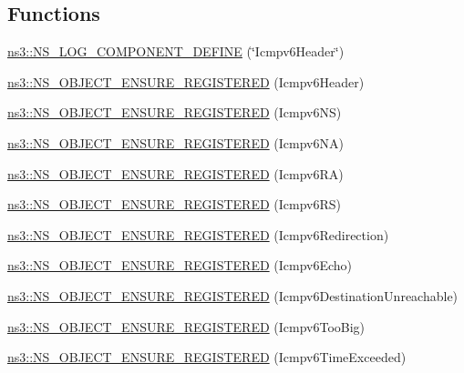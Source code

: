 \subsection*{Functions}
\begin{DoxyCompactItemize}
\item 
\hyperlink{namespacens3_ae111600e6aebec8dbdc5d34840d0b7fa}{ns3\+::\+N\+S\+\_\+\+L\+O\+G\+\_\+\+C\+O\+M\+P\+O\+N\+E\+N\+T\+\_\+\+D\+E\+F\+I\+NE} (\char`\"{}Icmpv6\+Header\char`\"{})
\item 
\hyperlink{namespacens3_a9ea123e4e086fed6c41c4d72d6f23303}{ns3\+::\+N\+S\+\_\+\+O\+B\+J\+E\+C\+T\+\_\+\+E\+N\+S\+U\+R\+E\+\_\+\+R\+E\+G\+I\+S\+T\+E\+R\+ED} (Icmpv6\+Header)
\item 
\hyperlink{namespacens3_aee34bf42a82713fba346d22b261981a1}{ns3\+::\+N\+S\+\_\+\+O\+B\+J\+E\+C\+T\+\_\+\+E\+N\+S\+U\+R\+E\+\_\+\+R\+E\+G\+I\+S\+T\+E\+R\+ED} (Icmpv6\+NS)
\item 
\hyperlink{namespacens3_a567f2825626bed912155d7aa886175b0}{ns3\+::\+N\+S\+\_\+\+O\+B\+J\+E\+C\+T\+\_\+\+E\+N\+S\+U\+R\+E\+\_\+\+R\+E\+G\+I\+S\+T\+E\+R\+ED} (Icmpv6\+NA)
\item 
\hyperlink{namespacens3_aaf7c89f01f793c3c0516d44c95df66ec}{ns3\+::\+N\+S\+\_\+\+O\+B\+J\+E\+C\+T\+\_\+\+E\+N\+S\+U\+R\+E\+\_\+\+R\+E\+G\+I\+S\+T\+E\+R\+ED} (Icmpv6\+RA)
\item 
\hyperlink{namespacens3_ad5a25d15024e8de6d42c71b781e3e631}{ns3\+::\+N\+S\+\_\+\+O\+B\+J\+E\+C\+T\+\_\+\+E\+N\+S\+U\+R\+E\+\_\+\+R\+E\+G\+I\+S\+T\+E\+R\+ED} (Icmpv6\+RS)
\item 
\hyperlink{namespacens3_a1b95da2bd5ab2bd6edf77e4fe580cc78}{ns3\+::\+N\+S\+\_\+\+O\+B\+J\+E\+C\+T\+\_\+\+E\+N\+S\+U\+R\+E\+\_\+\+R\+E\+G\+I\+S\+T\+E\+R\+ED} (Icmpv6\+Redirection)
\item 
\hyperlink{namespacens3_aed6baaf053dcf5ece7b9c7a5473bdc43}{ns3\+::\+N\+S\+\_\+\+O\+B\+J\+E\+C\+T\+\_\+\+E\+N\+S\+U\+R\+E\+\_\+\+R\+E\+G\+I\+S\+T\+E\+R\+ED} (Icmpv6\+Echo)
\item 
\hyperlink{namespacens3_a12b077a3fb27502ef94a367df802f371}{ns3\+::\+N\+S\+\_\+\+O\+B\+J\+E\+C\+T\+\_\+\+E\+N\+S\+U\+R\+E\+\_\+\+R\+E\+G\+I\+S\+T\+E\+R\+ED} (Icmpv6\+Destination\+Unreachable)
\item 
\hyperlink{namespacens3_af54388fc9a699efbee64e90fa887f806}{ns3\+::\+N\+S\+\_\+\+O\+B\+J\+E\+C\+T\+\_\+\+E\+N\+S\+U\+R\+E\+\_\+\+R\+E\+G\+I\+S\+T\+E\+R\+ED} (Icmpv6\+Too\+Big)
\item 
\hyperlink{namespacens3_a32ae88ea82aca661e8376f4f2f6e8e77}{ns3\+::\+N\+S\+\_\+\+O\+B\+J\+E\+C\+T\+\_\+\+E\+N\+S\+U\+R\+E\+\_\+\+R\+E\+G\+I\+S\+T\+E\+R\+ED} (Icmpv6\+Time\+Exceeded)

\end{DoxyCompactItemize}
